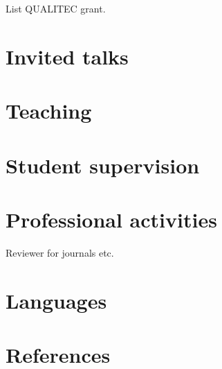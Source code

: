 \documentclass[12pt]{moderncv}
\begin{document}
List QUALITEC grant.

\section{Invited talks}

\section{Teaching}

\section{Student supervision}

\section{Professional activities}

Reviewer for journals etc.

\section{Languages}


\section{References}
\end{document}
